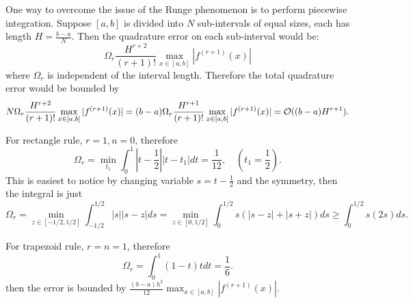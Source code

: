 One way to overcome the issue of the Runge phenomenon is to perform piecewise integration. Suppose $[a, b]$ is divided into $N$ sub-intervals of equal sizes, each has length $H = \frac{b-a}{N}$. Then the quadrature error on each sub-interval would be:
$$\Omega_r \frac{H^{r+2}}{(r+1)!}   \max_{x\in[a,b]}|f^{(r+1)}(x)|$$
where $\Omega_r$ is independent of the interval length. Therefore the total quadrature error would be bounded by 
$$N\Omega_r \frac{H^{r+2}}{(r+1)!}   \max_{x\in[a,b]}|f^{(r+1)}(x)| =  (b-a)\Omega_r \frac{H^{r+1}}{(r+1)!}   \max_{x\in[a,b]}|f^{(r+1)}(x)| =\mathcal O((b-a)H^{r+1}).$$
\begin{example} 
    For rectangle rule, $r = 1, n= 0$, therefore 
    \begin{equation}
        \Omega_r = \min_{t_1} \int_0^1 |t - \frac{1}{2}||t - t_1| dt  = \frac{1}{12}, \quad (t_1 = \frac{1}{2}).
    \end{equation}
This is easiest to notice by changing variable $s = t - \frac{1}{2}$ and the symmetry, then the integral is just 
$$\Omega_r = \min_{z\in [-1/2, 1/2]} \int_{-1/2}^{1/2} |s||s - z| ds =  \min_{z\in [0, 1/2]} \int_{0}^{1/2} s (|s - z| + |s + z|) ds \ge   \int_{0}^{1/2} s (2s) ds. $$ 
\end{example}
\begin{example}
    For trapezoid rule, $r = n = 1$, therefore 
    \begin{equation}
        \Omega_r = \int_0^1 (1-t)t dt = \frac{1}{6}.
    \end{equation}
    then the error is bounded by $\frac{(b-a)h^2}{12}  \max_{x\in[a,b]}|f^{(r+1)}(x)|$. 
\end{example}


